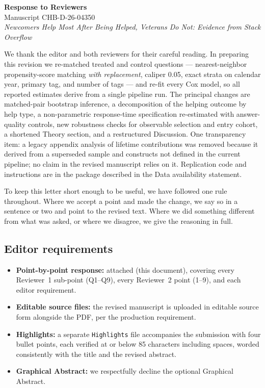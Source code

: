 \documentclass[11pt]{article}
\begin{document}
\begin{center}
{\large\bfseries Response to Reviewers}\\[2pt]
Manuscript CHB-D-26-04350\\
\emph{Newcomers Help Most After Being Helped, Veterans Do Not: Evidence from Stack Overflow}
\end{center}

We thank the editor and both reviewers for their careful reading. In preparing this revision we re-matched treated and control questions --- nearest-neighbor propensity-score matching \emph{with replacement}, caliper 0.05, exact strata on calendar year, primary tag, and number of tags --- and re-fit every Cox model, so all reported estimates derive from a single pipeline run. The principal changes are matched-pair bootstrap inference, a decomposition of the helping outcome by help type, a non-parametric response-time specification re-estimated with answer-quality controls, new robustness checks for observable selection and entry cohort, a shortened Theory section, and a restructured Discussion. One transparency item: a legacy appendix analysis of lifetime contributions was removed because it derived from a superseded sample and constructs not defined in the current pipeline; no claim in the revised manuscript relies on it. Replication code and instructions are in the package described in the Data availability statement.

To keep this letter short enough to be useful, we have followed one rule throughout. Where we accept a point and made the change, we say so in a sentence or two and point to the revised text. Where we did something different from what was asked, or where we disagree, we give the reasoning in full.

\subsection*{Editor requirements}

\begin{itemize}
\item \textbf{Point-by-point response:} attached (this document), covering every Reviewer~1 sub-point (Q1--Q9), every Reviewer~2 point (1--9), and each editor requirement.
\item \textbf{Editable source files:} the revised manuscript is uploaded in editable source form alongside the PDF, per the production requirement.
\item \textbf{Highlights:} a separate \texttt{Highlights} file accompanies the submission with four bullet points, each verified at or below 85 characters including spaces, worded consistently with the title and the revised abstract.
\item \textbf{Graphical Abstract:} we respectfully decline the optional Graphical Abstract.
\end{itemize}
\end{document}
